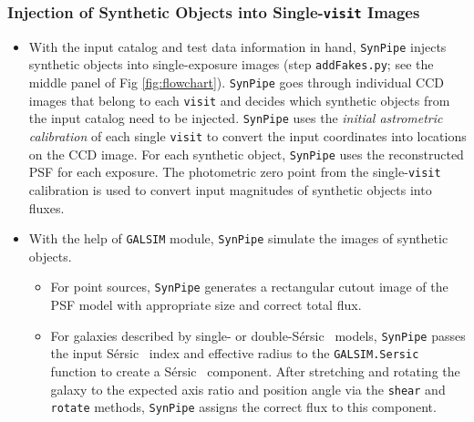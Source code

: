 \documentclass[useamsfonts]{pasj01}
\def\ser{{S\'{e}rsic\ }}
\def\synpipe{\texttt{SynPipe}}
\def\visit{\texttt{visit}}
\def\galsim{\texttt{G}{\scriptsize \texttt{AL}}\texttt{S}{\scriptsize \texttt{IM}}}
\begin{document}

\subsubsection{Injection of Synthetic Objects into Single-\visit{} Images}
    \label{sssec:addFakes}
    
    \begin{itemize}
    
        \item With the input catalog and test data information in hand, \synpipe{} 
            injects synthetic objects into single-exposure images (step
            \texttt{addFakes.py}; see the middle panel of Fig \ref{fig:flowchart}).
            \synpipe{} goes through individual CCD images that belong to 
            each \visit{} and decides which synthetic objects from the input catalog 
            need to be injected. 
            \synpipe{} uses the \textit{initial astrometric calibration} of each 
            single \visit{} to convert the input coordinates into locations on the 
            CCD image. 
            For each synthetic object, \synpipe{} uses the reconstructed PSF for each 
            exposure.  
            The photometric zero point from the single-\visit{} calibration is used
            to convert input magnitudes of synthetic objects into fluxes.
    
        \item With the help of \galsim{} module, \synpipe{} simulate the images of
            synthetic objects.
            \begin{itemize}
            
            \item For point sources, \synpipe{} generates a rectangular cutout image 
                of the PSF model with appropriate size and correct total flux. 
            
            \item For galaxies described by single- or double-\ser{} models, 
                \synpipe{} passes the input \ser{} index and effective radius to 
                the \galsim{}\texttt{.Sersic} function to create a \ser{} component.
                After stretching and rotating the galaxy to the expected axis ratio 
                and position angle via the \texttt{shear} and \texttt{rotate} methods,
                \synpipe{} assigns the correct flux to this component.
            

\end{itemize}
\end{itemize}
\end{document}
